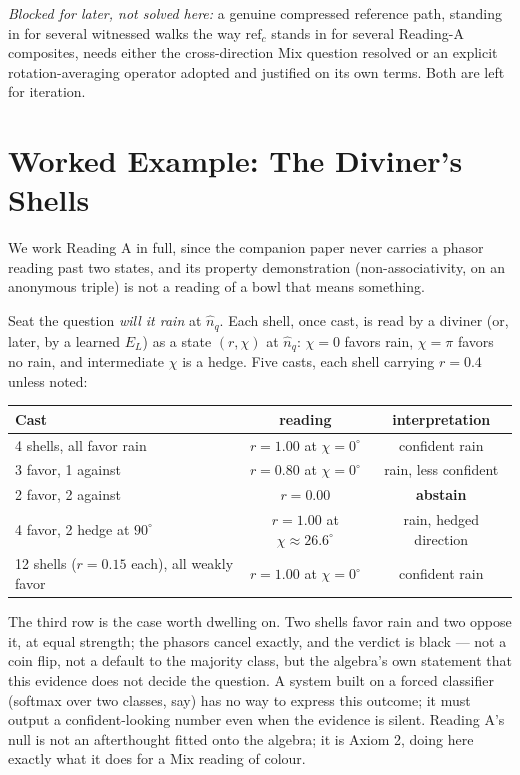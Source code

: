 \documentclass[12pt, a4paper]{article}
\begin{document}
\emph{Blocked for later, not solved here:} a genuine compressed
reference path, standing in for several witnessed walks the way
$\mathrm{ref}_c$ stands in for several Reading-A composites, needs
either the cross-direction Mix question resolved or an explicit
rotation-averaging operator adopted and justified on its own terms.
Both are left for iteration.

\section{Worked Example: The Diviner's Shells}
\label{sec:worked_example}

We work Reading A in full, since the companion paper never carries a
phasor reading past two states, and its property demonstration
(non-associativity, on an anonymous triple) is not a reading of a
bowl that means something.

Seat the question \emph{will it rain} at $\hat n_q$. Each shell, once
cast, is read by a diviner (or, later, by a learned $E_L$) as a state
$(r,\chi)$ at $\hat n_q$: $\chi=0$ favors rain, $\chi=\pi$ favors no
rain, and intermediate $\chi$ is a hedge. Five casts, each shell
carrying $r=0.4$ unless noted:

\begin{center}
\begin{tabular}{lcc}
\hline
Cast & reading & interpretation \\
\hline
4 shells, all favor rain      & $r=1.00$ at $\chi=0^\circ$   & confident rain \\
3 favor, 1 against            & $r=0.80$ at $\chi=0^\circ$   & rain, less confident \\
2 favor, 2 against            & $r=0.00$                     & \textbf{abstain} \\
4 favor, 2 hedge at $90^\circ$ & $r=1.00$ at $\chi\approx 26.6^\circ$ & rain, hedged direction \\
12 shells ($r=0.15$ each), all weakly favor    & $r=1.00$ at $\chi=0^\circ$   & confident rain \\
\hline
\end{tabular}
\end{center}

The third row is the case worth dwelling on. Two shells favor rain and
two oppose it, at equal strength; the phasors cancel exactly, and the
verdict is black --- not a coin flip, not a default to the majority
class, but the algebra's own statement that this evidence does not
decide the question. A system built on a forced classifier (softmax
over two classes, say) has no way to express this outcome; it must
output a confident-looking number even when the evidence is silent.
Reading A's null is not an afterthought fitted onto the algebra; it is
Axiom 2, doing here exactly what it does for a Mix reading of colour.
\end{document}
